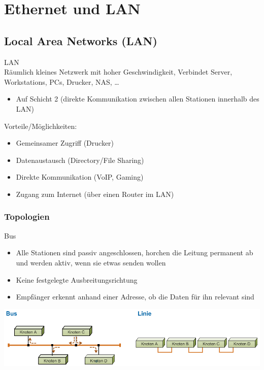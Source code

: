 \section{Ethernet und LAN}
\subsection{Local Area Networks (LAN)}

\begin{definition}{LAN}\\
    Räumlich kleines Netzwerk mit hoher Geschwindigkeit, Verbindet Server, Workstations, PCs, Drucker, NAS, …
    \begin{itemize}
        \item Auf Schicht 2 (direkte Kommunikation zwischen allen Stationen innerhalb des LAN)
    \end{itemize}
    Vorteile/Möglichkeiten:
    \begin{itemize}
        \item Gemeinsamer Zugriff (Drucker)
        \item Datenaustausch (Directory/File Sharing)
        \item Direkte Kommunikation (VoIP, Gaming)
        \item Zugang zum Internet (über einen Router im LAN)
    \end{itemize}
\end{definition}

\subsubsection{Topologien}

\begin{definition}{Bus}
    \begin{itemize}
        \item Alle Stationen sind passiv angeschlossen, horchen die Leitung permanent ab und werden aktiv, wenn sie etwas senden wollen
        \item Keine festgelegte Ausbreitungsrichtung
        \item Empfänger erkennt anhand einer Adresse, ob die Daten für ihn relevant sind
    \end{itemize}
\end{definition}

 
    \centering
    \includegraphics[width=0.9\linewidth]{images/bus_linie_topo.png}
 

